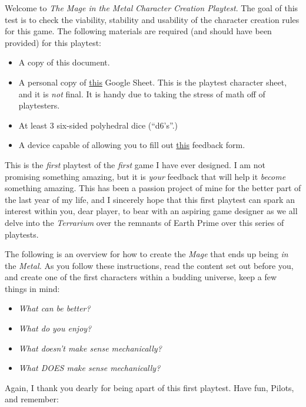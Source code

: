 \documentclass[
]{article}
\providecommand{\tightlist}{%
  \setlength{\itemsep}{0pt}\setlength{\parskip}{0pt}}
\begin{document}
Welcome to {{\emph{The Mage in the Metal}}} \emph{Character Creation
Playtest}. The goal of this test is to check the viability, stability
and usability of the character creation rules for this game. The
following materials are required (and should have been provided) for
this playtest:

\begin{itemize}
\tightlist
\item
  A copy of this document.
\item
  A personal copy of
  \href{https://docs.google.com/spreadsheets/d/11sFDvnzlPyw0b4NcCGj40xoyfQpYLrE9l6w3kMeaYho/edit?usp=sharing}{this}
  Google Sheet. This is the playtest character sheet, and it is
  \emph{not} final. It is handy due to taking the stress of math off of
  playtesters.
\item
  At least 3 six-sided polyhedral dice (``d6's''.)
\item
  A device capable of allowing you to fill out
  \href{https://forms.gle/osrYS3qtCQ6ktG6m8}{this} feedback form.
\end{itemize}

This is the \emph{first} playtest of the \emph{first} game I have ever
designed. I am not promising something amazing, but it is \emph{your}
feedback that will help it \emph{become} something amazing. This has
been a passion project of mine for the better part of the last year of
my life, and I sincerely hope that this first playtest can spark an
interest within you, dear player, to bear with an aspiring game designer
as we all delve into the \emph{Terrarium} over the remnants of Earth
Prime over this series of playtests.

The following is an overview for how to create the \emph{Mage} that ends
up being \emph{in} the \emph{Metal.} As you follow these instructions,
read the content set out before you, and create one of the first
characters within a budding universe, keep a few things in mind:

\begin{itemize}
\tightlist
\item
  \emph{What can be better?}
\item
  \emph{What do you enjoy?}
\item
  \emph{What doesn't make sense mechanically?}
\item
  \emph{What DOES make sense mechanically?}
\end{itemize}

Again, I thank you dearly for being apart of this first playtest. Have
fun, Pilots, and remember:
\end{document}
